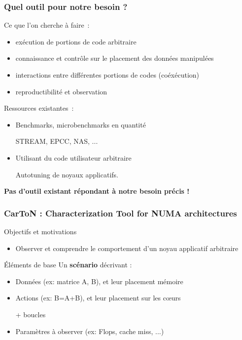 \documentclass[xcolor={usenames,dvipsnames,svgnames,table}, aspectratio=43]{beamer}
\begin{document}
\begin{frame}
  \frametitle{Quel outil pour notre besoin ?}

  Ce que l'on cherche à faire~:
  \begin{itemize}
    \item exécution de portions de code arbitraire
    \item connaissance et contrôle sur le placement des données manipulées
    \item interactions entre différentes portions de codes (coéxécution)
    \item reproductibilité et observation
  \end{itemize}

  Ressources existantes~:
  \begin{itemize}
    \item Benchmarks, microbenchmarks en quantité

      STREAM, EPCC, NAS, ...

    \item Utilisant du code utilisateur arbitraire

      Autotuning de noyaux applicatifs.
  \end{itemize}

  \textbf{Pas d'outil existant répondant à notre besoin précis !}

\end{frame}

\begin{frame}
  \frametitle{CarToN : Characterization Tool for NUMA architectures}

  \begin{block}{Objectifs et motivations}
    \begin{itemize}
      \item Observer et comprendre le comportement d'un noyau applicatif arbitraire
    \end{itemize}
  \end{block}

  \begin{block}{Éléments de base}
    Un \textbf{scénario} décrivant :
    \begin{itemize}
      \item Données (ex: matrice A, B), et leur placement mémoire
      \item Actions (ex: B=A+B), et leur placement sur les cœurs

	+ boucles
      \item Paramètres à observer (ex: Flops, cache miss, ...)
    \end{itemize}
  \end{block}
\end{frame}
\end{document}
